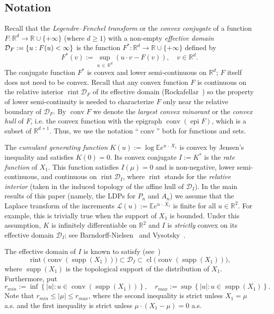 \documentclass[10pt]{amsart}
\theoremstyle{definition}\newtheorem{defi}[theo]{Definition}\newtheorem{rema}[theo]{Remark}\newtheorem{exam}[theo]{Example}\newtheorem{exem}[theo]{Example}\newtheorem{nota}[theo]{Notation}
\DeclareMathOperator{\conv}{conv}
\DeclareMathOperator{\cl}{cl}
\DeclareMathOperator{\rint}{rint}
\DeclareMathOperator{\epi}{epi}
\newcommand{\Rbb}{\mathbb{R}}
\newcommand{\E}{\mathbb{E}}
\newcommand{\Dcl}{\mathcal{D}}
\newcommand{\Lcl}{\mathcal{L}}
\newcommand{\supp}{\mathop{\mathrm{supp}}\nolimits}
\begin{document}
\subsection{Notation} \label{sec: notation}
Recall that the \emph{Legendre--Fenchel transform} or the \emph{convex conjugate} of a function $F:\Rbb^d \to \Rbb \cup \{+ \infty\}$ (where $d \ge 1$) with a non-empty \emph{effective domain} $\Dcl_F:=\linebreak\{u: F(u) < \infty\}$ is the function $F^*:\Rbb^d \to \Rbb \cup \{+ \infty\}$ defined by
\[
F^*(v):= \sup_{u\,\in\,\Rbb^d} \left(u \cdot v - F(v) \right), \quad v \in \Rbb^d.
\]
The conjugate function $F^*$ is convex and lower semi-continuous on $\Rbb^d$; $F$ itself does not need to be convex. Recall that any convex function $F$ is continuous on the relative interior $\rint \Dcl_F$ of its effective domain (Rockafellar~\cite[Theorem~10.1]{Rockafellar}) so the property of lower semi-continuity is needed to characterize $F$ only near the relative boundary of $\Dcl_F$. By $\conv F$ we denote the \emph{largest convex minorant} or the \emph{convex hull} of $F$, i.e. the convex function with the epigraph $\conv(\epi F)$, which is a subset of $\Rbb^{d+1}$. Thus, we use the notation ``$\conv$'' both for functions and sets.

The \emph{cumulant generating function} $K(u):=\log \E e^{u\, \cdot\,X_1}$ is convex by Jensen's inequality and satisfies $K(0)=0$. Its convex conjugate $I:=K^*$ is the \emph{rate function} of $X_1$. This function satisfies $I(\mu)=0$ and is non-negative, lower semi-continuous, and continuous on $\rint \Dcl_I$, where $\rint$ stands for the \emph{relative interior} (taken in the induced topology of the affine hull of $\Dcl_I$). In the main results of this paper (namely, the LDPs for $P_n$ and $A_n$) we assume that the Laplace transform of the increments $\Lcl(u):= \E e^{u\,\cdot \,X_1}$ is finite for all $u\in\Rbb^2$. For example, this is trivially true when the support of $X_1$ is bounded. Under this assumption, $K$ is infinitely differentiable on $\Rbb^2$ and $I$ is \emph{strictly} convex on its effective domain $\Dcl_I$; see Barndorff-Nielsen~\cite[Corollary~7.1]{B-N} and Vysotsky~\cite[Corollary~2.12]{VysotskyStrict}.

The effective domain of $I$ is known to satisfy (see~\cite[Proposition~1.1.a]{VysotskyStrict})
\begin{equation}\label{eq: D_I inclusions}
\rint\big(\conv(\supp(X_1))\big) \subset \Dcl_{I} \subset \cl\big(\conv(\supp(X_1))\big),
\end{equation}
where $\supp(X_1)$ is the topological support of the distribution of $X_1$. Furthermore, put
\[
r_{min}:= \inf \left\{|u|: u \in \conv(\supp(X_1)) \right\}, \quad r_{max}:= \sup \left\{|u|: u \in \supp(X_1) \right\}.
\]
Note that $r_{min} \le |\mu| \le r_{max}$, where the second inequality is strict unless $X_1 = \mu$ a.s. and the first inequality is strict unless $\mu \cdot (X_1 - \mu) = 0$ a.s.
\end{document}
